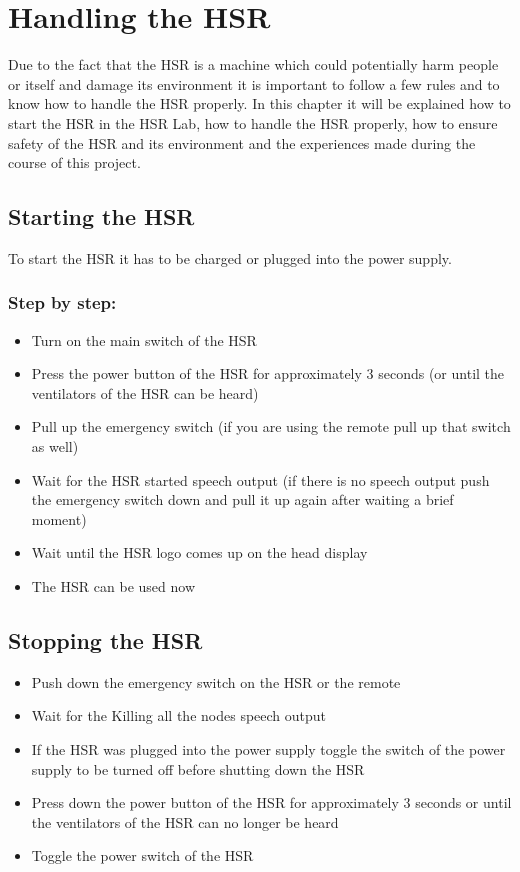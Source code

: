 \documentclass[main.tex]{subfiles}
\begin{document}
	\chapter{Handling the HSR}
	\label{workin_hsr}
	
	Due to the fact that the HSR is a machine which could potentially harm people or itself and damage its environment it is important to follow a few rules and to know how to handle the HSR properly. In this chapter it will be explained how to start the HSR in the HSR Lab, how to handle the HSR properly, how to ensure safety of the HSR and its environment and the experiences made during the course of this project.

	\section{Starting the HSR}
	To start the HSR it has to be charged or plugged into the power supply.
	\subsection{Step by step:}
	\begin{itemize}
		\item Turn on the main switch of the HSR
		\item Press the power button of the HSR for approximately 3 seconds (or until the ventilators of the HSR can be heard)
		\item Pull up the emergency switch (if you are using the remote pull up that switch as well)
		\item Wait for the HSR started speech output (if there is no speech output push the emergency switch down and pull it up again after waiting a brief moment)
		\item Wait until the HSR logo comes up on the head display
		\item The HSR can be used now
	\end{itemize}
	\section{Stopping the HSR}
	\begin{itemize}
		\item Push down the emergency switch on the HSR or the remote
		\item Wait for the Killing all the nodes speech output
		\item If the HSR was plugged into the power supply toggle the switch of the power supply to be turned off before shutting down the HSR
		\item Press down the power button of the HSR for approximately 3 seconds or until the ventilators of the HSR can no longer be heard
		\item Toggle the power switch of the HSR
	\end{itemize}
\end{document}
